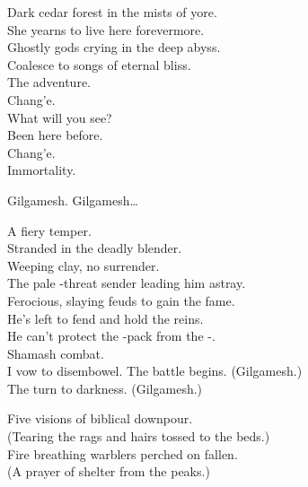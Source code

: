 Dark cedar forest in the mists of yore. \\
She yearns to live here forevermore. \\
Ghostly gods crying in the deep abyss. \\
Coalesce to songs of eternal bliss. \\

The adventure. \\
Chang'e. \\
What will you see? \\
Been here before. \\
Chang'e. \\
Immortality. \\




Gilgamesh. Gilgamesh… \\


A fiery temper. \\
Stranded in the deadly blender. \\
Weeping  clay, no surrender. \\
The pale -threat sender leading him astray. \\
Ferocious, slaying feuds to gain the fame. \\
He's left to fend and hold the reins. \\
He can't protect the -pack from the -. \\
Shamash combat. \\

I vow to disembowel. The battle begins. (Gilgamesh.) \\
The  turn to darkness. (Gilgamesh.) \\


Five visions of biblical downpour. \\
(Tearing the rags and hairs tossed to the  beds.) \\
Fire breathing warblers perched on fallen. \\
(A prayer of shelter from the peaks.) \\


